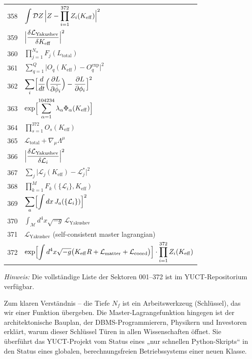 \documentclass[12pt,a4paper]{article}
\begin{document}
\begin{longtable}{r p{}}
	358 & \(\displaystyle \int\mathcal{D}Z\,\Bigl|Z - \prod_{i=1}^{372}Z_i(K_{\mathrm{eff}})\Bigr|^2\) \\
	359 & \(\displaystyle \Bigl|\frac{\delta\mathcal{L}_{\text{Yakushev}}}{\delta K_{\mathrm{eff}}}\Bigr|^2\) \\
	360 & \(\displaystyle \prod_{j=1}^{N_\alpha}F_j(L_{\text{total}})\) \\
	361 & \(\displaystyle \sum_{q=1}^Q\bigl|O_q(K_{\mathrm{eff}}) - O_q^{\text{exp}}\bigr|^2\) \\
	362 & \(\displaystyle \sum_i\Bigl[\frac{d}{dt}\Bigl(\frac{\partial L}{\partial\dot\phi_i}\Bigr) - \frac{\partial L}{\partial\phi_i}\Bigr]^2\) \\
	363 & \(\displaystyle \exp\Bigl[\sum_{\alpha=1}^{104234}\lambda_\alpha\Phi_\alpha(K_{\mathrm{eff}})\Bigr]\) \\
	364 & \(\displaystyle \prod_{s=1}^{372}O_s(K_{\mathrm{eff}})\) \\
	365 & \(\displaystyle \mathcal{L}_{\text{total}} + \nabla_\mu\Lambda^\mu\) \\
	366 & \(\displaystyle \Bigl|\frac{\delta\mathcal{L}_{\text{Yakushev}}}{\delta\mathcal{L}_i}\Bigr|^2\) \\
	367 & \(\displaystyle \sum_j\bigl|\mathcal{L}_j(K_{\mathrm{eff}}) - \mathcal{L}_j^*\bigr|^2\) \\
	368 & \(\displaystyle \prod_{k=1}^M F_k(\{\mathcal{L}_i\},K_{\mathrm{eff}})\) \\
	369 & \(\displaystyle \sum_a\Bigl[\int dx\,J_a(\{\mathcal{L}_i\})\Bigr]^2\) \\
	370 & \(\displaystyle \int_{\mathcal{M}} d^4x\sqrt{-g}\,\mathcal{L}_{\text{Yakushev}}\) \\
	371 & \(\displaystyle \mathcal{L}_{\text{Yakushev}}\) (self-consistent master lagrangian) \\
	372 & \(\displaystyle \exp\Bigl[\int d^4x\sqrt{-g}\bigl(K_{\mathrm{eff}}R + \mathcal{L}_{\text{matter}} + \mathcal{L}_{\text{coord}}\bigr)\Bigr]\cdot\prod_{i=1}^{372}Z_i(K_{\mathrm{eff}})\) \\
	
\end{longtable}
	
	\textit{Hinweis:} Die vollständige Liste der Sektoren 001--372 ist im YUCT-Repositorium verfügbar.
	
	\small
	Zum klaren Verständnis – die Tiefe \(N_{f}\) ist ein Arbeitswerkzeug (Schlüssel), das wir einer Funktion übergeben. Die Master-Lagrangefunktion hingegen ist der architektonische Bauplan, der DBMS-Programmierern, Physikern und Investoren erklärt, warum dieser Schlüssel Türen in allen Wissenschaften öffnet. Sie überführt das YUCT-Projekt vom Status eines „nur schnellen Python-Skripts“ in den Status eines globalen, berechnungsfreien Betriebssystems einer neuen Klasse.
	
\end{document}
